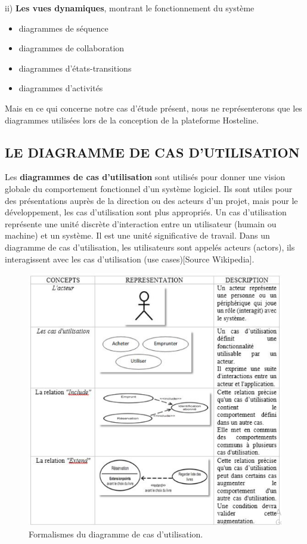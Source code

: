 ii)	\textbf{Les vues dynamiques}, montrant le fonctionnement du système
\begin{itemize}
		\item diagrammes de séquence
		\item diagrammes de collaboration
		\item diagrammes d’états-transitions
		\item diagrammes d’activités
	\end{itemize}

Mais en ce qui concerne notre cas d’étude présent, nous ne représenterons que les diagrammes utilisées lors de la conception de la plateforme Hosteline.

\subsection{LE DIAGRAMME DE CAS D’UTILISATION}

Les \textbf{diagrammes de cas d'utilisation} sont utilisés pour donner une vision globale du comportement fonctionnel d'un système logiciel. Ils sont utiles pour des présentations auprès de la direction ou des acteurs d'un projet, mais pour le développement, les cas d'utilisation sont plus appropriés. Un cas d'utilisation représente une unité discrète d'interaction entre un utilisateur (humain ou machine) et un système. Il est une unité significative de travail. Dans un diagramme de cas d'utilisation, les utilisateurs sont appelés acteurs (actors), ils interagissent avec les cas d'utilisation (use cases)[Source Wikipedia].

\begin{figure}[!htbp]
	\begin{center}
		\includegraphics[scale=0.95]{images/form_use_case.png}
		\caption{Formalismes du diagramme de cas d'utilisation.}
		\label{use_case_summary}
	\end{center}
\end{figure}

